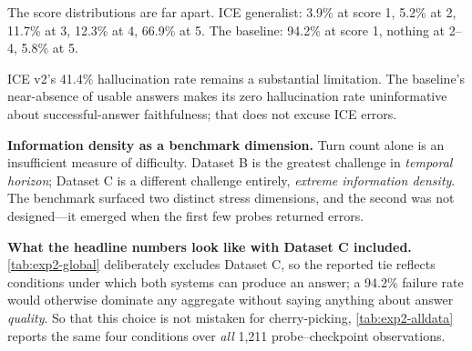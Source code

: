 \documentclass[11pt,a4paper]{article}
\begin{document}
\begin{table}[htbp]
\centering
\small
\caption{ICE v2 density stress test on Dataset C (154 probe--checkpoint observations). The vector baseline collapses because it has no token-budget cap. ICE survives with a mean score of 4.33 and 77\% fewer tokens injected. The baseline's 0\% hallucination rate is an artefact: 94.2\% of its responses are complete failures, so there is no answer to evaluate.}
\label{tab:stress}
\end{table}

The score distributions are far apart. ICE generalist: 3.9\% at score 1, 5.2\% at 2, 11.7\% at 3, 12.3\% at 4, 66.9\% at 5. The baseline: 94.2\% at score 1, nothing at 2--4, 5.8\% at 5.

ICE v2's 41.4\% hallucination rate remains a substantial limitation. The baseline's near-absence of usable answers makes its zero hallucination rate uninformative about successful-answer faithfulness; that does not excuse ICE errors.

\textbf{Information density as a benchmark dimension.} Turn count alone is an insufficient measure of difficulty. Dataset B is the greatest challenge in \emph{temporal horizon}; Dataset C is a different challenge entirely, \emph{extreme information density}. The benchmark surfaced two distinct stress dimensions, and the second was not designed---it emerged when the first few probes returned errors.

\textbf{What the headline numbers look like with Dataset C included.} \cref{tab:exp2-global} deliberately excludes Dataset C, so the reported tie reflects conditions under which both systems can produce an answer; a 94.2\% failure rate would otherwise dominate any aggregate without saying anything about answer \emph{quality}. So that this choice is not mistaken for cherry-picking, \cref{tab:exp2-alldata} reports the same four conditions over \emph{all} 1{,}211 probe--checkpoint observations.
\end{document}
